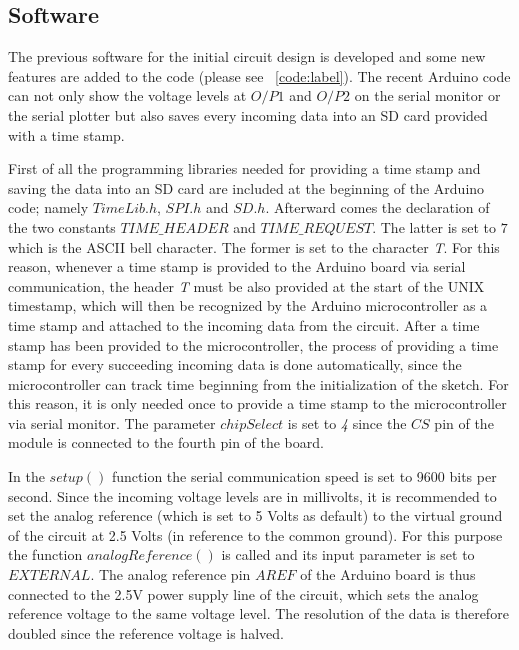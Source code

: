 \subsection{Software}
The previous software for the initial circuit design is developed and some new features are added to the code (please see ~\ref{code:label}). The recent Arduino code can not only show the voltage levels at $O/P1$ and $O/P2$ on the serial monitor or the serial plotter but also saves every incoming data into an SD card provided with a time stamp.\par 
First of all the programming libraries needed for providing a time stamp and saving the data into an SD card are included at the beginning of the Arduino code; namely $TimeLib.h$, $SPI.h$ and $SD.h$. Afterward comes the declaration of the two constants $TIME\_HEADER$ and $TIME\_REQUEST$. The latter is set to $7$ which is the ASCII bell character. The former is set to the character \textit{T}. For this reason, whenever a time stamp is provided to the Arduino board via serial communication, the header \textit{T} must be also provided at the start of the UNIX timestamp, which will then be recognized by the Arduino microcontroller as a time stamp and attached to the incoming data from the circuit. After a time stamp has been provided to the microcontroller, the process of providing a time stamp for every succeeding incoming data is done automatically, since the microcontroller can track time beginning from the initialization of the sketch. For this reason, it is only needed once to provide a time stamp to the microcontroller via serial monitor. The parameter $chipSelect$ is set to \textit{4} since the $CS$ pin of the module is connected to the fourth pin of the board. \par
In the $setup()$ function the serial communication speed is set to 9600 bits per second. Since the incoming voltage levels are in millivolts, it is recommended to set the analog reference (which is set to 5 Volts as default) to the virtual ground of the circuit at 2.5 Volts (in reference to the common ground). For this purpose the function $analogReference()$ is called and its input parameter is set to $EXTERNAL$. The analog reference pin $AREF$ of the Arduino board is thus connected to the 2.5V power supply line of the circuit, which sets the analog reference voltage to the same voltage level. The resolution of the data is therefore doubled since the reference voltage is halved.\par

